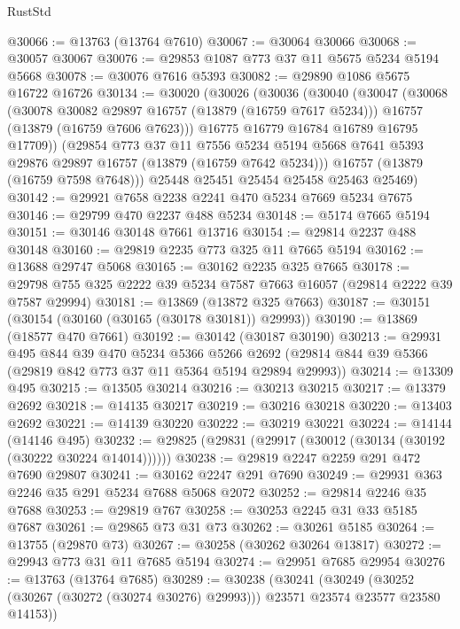 \begin{lexlean}{RustStd}
\begin{coremodule}
@30066 := @13763 (@13764 @7610)
@30067 := @30064 @30066
@30068 := @30057 @30067
@30076 := @29853 @1087 @773 @37 @11 @5675 @5234 @5194 @5668
@30078 := @30076 @7616 @5393
@30082 := @29890 @1086 @5675 @16722 @16726
@30134 := @30020
    (@30026
      (@30036
        (@30040
          (@30047
            (@30068
              (@30078 @30082 @29897 @16757 (@13879 (@16759 @7617 @5234)))
              @16757
              (@13879 (@16759 @7606 @7623)))
            @16775
            @16779
            @16784
            @16789
            @16795
            @17709))
        (@29854
          @773
          @37
          @11
          @7556
          @5234
          @5194
          @5668
          @7641
          @5393
          @29876
          @29897
          @16757
          (@13879 (@16759 @7642 @5234)))
        @16757
        (@13879 (@16759 @7598 @7648)))
      @25448
      @25451
      @25454
      @25458
      @25463
      @25469)
@30142 := @29921 @7658 @2238 @2241 @470 @5234 @7669 @5234 @7675
@30146 := @29799 @470 @2237 @488 @5234
@30148 := @5174 @7665 @5194
@30151 := @30146 @30148 @7661 @13716
@30154 := @29814 @2237 @488 @30148
@30160 := @29819 @2235 @773 @325 @11 @7665 @5194
@30162 := @13688 @29747 @5068
@30165 := @30162 @2235 @325 @7665
@30178 := @29798 @755 @325 @2222 @39 @5234 @7587 @7663 @16057 (@29814 @2222 @39 @7587 @29994)
@30181 := @13869 (@13872 @325 @7663)
@30187 := @30151 (@30154 (@30160 (@30165 (@30178 @30181)) @29993))
@30190 := @13869 (@18577 @470 @7661)
@30192 := @30142 (@30187 @30190)
@30213 := @29931
    @495
    @844
    @39
    @470
    @5234
    @5366
    @5266
    @2692
    (@29814 @844 @39 @5366 (@29819 @842 @773 @37 @11 @5364 @5194 @29894 @29993))
@30214 := @13309 @495
@30215 := @13505 @30214
@30216 := @30213 @30215
@30217 := @13379 @2692
@30218 := @14135 @30217
@30219 := @30216 @30218
@30220 := @13403 @2692
@30221 := @14139 @30220
@30222 := @30219 @30221
@30224 := @14144 (@14146 @495)
@30232 := @29825 (@29831 (@29917 (@30012 (@30134 (@30192 (@30222 @30224 @14014))))))
@30238 := @29819 @2247 @2259 @291 @472 @7690 @29807
@30241 := @30162 @2247 @291 @7690
@30249 := @29931 @363 @2246 @35 @291 @5234 @7688 @5068 @2072
@30252 := @29814 @2246 @35 @7688
@30253 := @29819 @767
@30258 := @30253 @2245 @31 @33 @5185 @7687
@30261 := @29865 @73 @31 @73
@30262 := @30261 @5185
@30264 := @13755 (@29870 @73)
@30267 := @30258 (@30262 @30264 @13817)
@30272 := @29943 @773 @31 @11 @7685 @5194
@30274 := @29951 @7685 @29954
@30276 := @13763 (@13764 @7685)
@30289 := @30238
    (@30241
      (@30249 (@30252 (@30267 (@30272 (@30274 @30276) @29993))) @23571 @23574 @23577 @23580 @14153))

\end{coremodule}
\end{lexlean}
